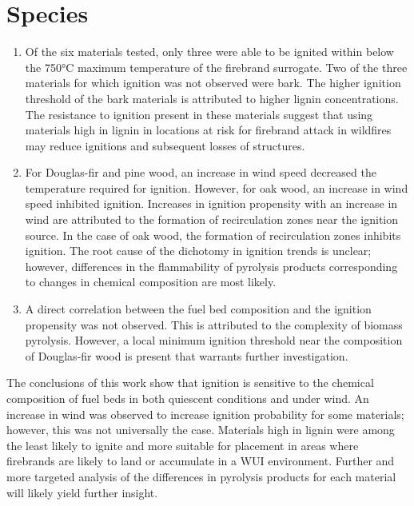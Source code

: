\section{Species}
        \begin{enumerate}
            \item Of the six materials tested, only three were able to be ignited within below the 750\si{\celsius} maximum temperature of the firebrand surrogate. Two of the three materials for which ignition was not observed were bark. The higher ignition threshold of the bark materials is attributed to higher lignin concentrations. The resistance to ignition present in these materials suggest that using materials high in lignin in locations at risk for firebrand attack in wildfires may reduce ignitions and subsequent losses of structures.
            
            \item For Douglas-fir and pine wood, an increase in wind speed decreased the temperature required for ignition. However, for oak wood, an increase in wind speed inhibited ignition. Increases in ignition propensity with an increase in wind are attributed to the formation of recirculation zones near the ignition source. In the case of oak wood, the formation of recirculation zones inhibits ignition. The root cause of the dichotomy in ignition trends is unclear; however, differences in the flammability of pyrolysis products corresponding to changes in chemical composition are most likely.
            
            \item A direct correlation between the fuel bed composition and the ignition propensity was not observed. This is attributed to the complexity of biomass pyrolysis. However, a local minimum ignition threshold near the composition of Douglas-fir wood is present that warrants further investigation. 
        \end{enumerate}
    The conclusions of this work show that ignition is sensitive to the chemical composition of fuel beds in both quiescent conditions and under wind. An increase in wind was observed to increase ignition probability for some materials; however, this was not universally the case. Materials high in lignin were among the least likely to ignite and more suitable for placement in areas where firebrands are likely to land or accumulate in a WUI environment. Further and more targeted analysis of the differences in pyrolysis products for each material will likely yield further insight. 

